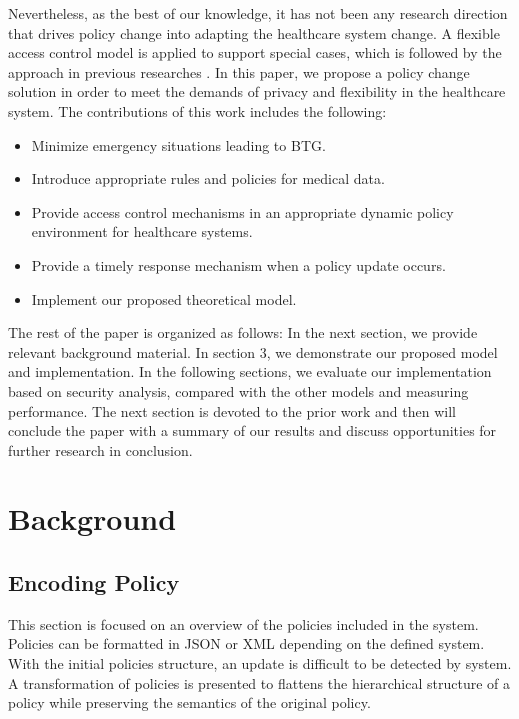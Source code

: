 Nevertheless, as the best of our knowledge, it has not been any research direction that drives policy change into adapting the healthcare system change.
A flexible access control model is applied to support special cases, which is followed by the approach in previous researches \cite{son2016rew,son2017rew}. 
In this paper, we propose a policy change solution in order to meet the demands of privacy and flexibility in the healthcare system.
The contributions of this work includes the following:
\begin{itemize}
  \item Minimize emergency situations leading to BTG.
  \item Introduce appropriate rules and policies for medical data.
  \item Provide access control mechanisms in an appropriate dynamic policy environment for healthcare systems. 
  \item Provide a timely response mechanism when a policy update occurs.
  \item Implement our proposed theoretical model.
\end{itemize}

The rest of the paper is organized as follows:
In the next section, we provide relevant background material.
In section 3, we demonstrate our proposed model and implementation.
In the following sections, we evaluate our implementation based on security analysis, compared with the other models and measuring performance.
The next section is devoted to the prior work and then will conclude the paper with a summary of our results and discuss opportunities for further research in conclusion.

\section{Background}\label{sec:back}

\subsection{Encoding Policy}\label{Back:encoding-policy}
This section is focused on an overview of the policies included in the system.
Policies can be formatted in JSON \cite{thi2017using} or XML\cite{rissanen2013extensible} depending on the defined system.
With the initial policies structure, an update is difficult to be detected by system.
A transformation of policies is presented  to flattens the hierarchical structure of a policy while preserving the semantics of the original policy. 

